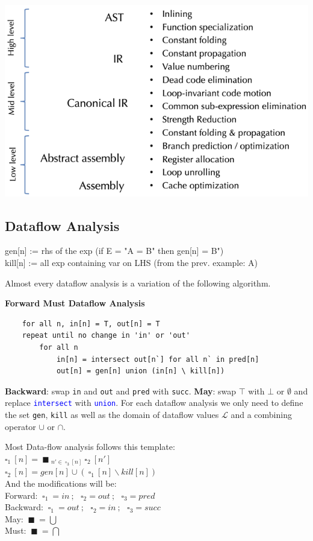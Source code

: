 \vspace{-15pt}
\begin{center}
	\includegraphics[width=0.9\linewidth]{assets/optimization_diag.png}
\end{center}
\vspace{-10pt}



\subsection*{Dataflow Analysis}

gen[n] := rhs of the exp (if E = "A = B" then gen[n] = B")\\
kill[n] := all exp containing var on LHS (from the prev. example: A)\medskip

Almost every dataflow analysis is a variation of the following algorithm.\smallskip

\textbf{Forward Must Dataflow Analysis}
\begin{lstlisting}
	for all n, in[n] = T, out[n] = T
	repeat until no change in 'in' or 'out'
		for all n
			in[n] = intersect out[n`] for all n` in pred[n]
			out[n] = gen[n] union (in[n] \ kill[n])	
\end{lstlisting}
\textbf{Backward}: swap \texttt{in} and \texttt{out} and \texttt{pred} with \texttt{succ}.
\textbf{May}: swap $\top$ with $\bot$ or $\emptyset$ and replace \textcolor{blue}{\texttt{intersect}} with \textcolor{blue}{\texttt{union}}.\medskip
For each dataflow analysis we only need to define the set \texttt{gen}, \texttt{kill} as well as the domain of dataflow values $\mathcal L$ and a combining operator $\cup$ or $\cap$.\medskip

Most Data-flow analysis follows this template: \\
$\square_1 \ [n] = \ \blacksquare \ _{n' \in \ \square_3 \ [n]} \ \square_2 \ [n']$ \\
$\square_2 \ [n] = gen[n] \cup (\ \square_1 \ [n] \backslash kill[n])$ \\
And the modifications will be: \\
Forward: $\ \square_1 \ = in \ ; \ \ \ \square_2 = out \ ; \ \ \ \square_3 = pred$ \\
Backward: $\ \square_1 \ = out \ ; \ \ \ \square_2 = in \ ; \ \ \ \square_3 = succ$ \\
May: $\ \blacksquare \ = \bigcup$ \\
Must: $\ \blacksquare \ = \bigcap$ \\
\medskip

